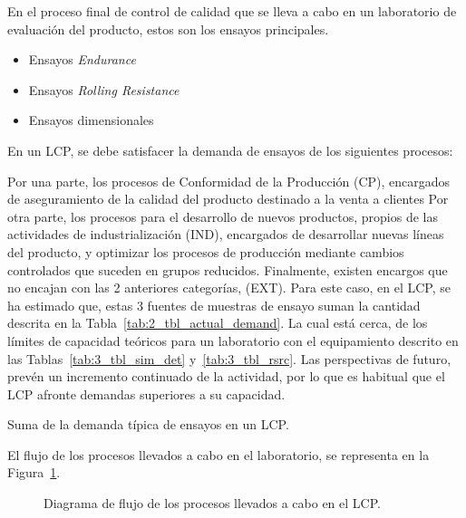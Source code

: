 En el proceso final de control de calidad
que se lleva a cabo en un laboratorio de evaluación del producto,
estos son los ensayos principales.

\begin{itemize}
	\item Ensayos \textit{Endurance}
	\item Ensayos \textit{Rolling Resistance}
	\item Ensayos dimensionales
\end{itemize}

En un LCP,
se debe satisfacer la demanda de ensayos de los siguientes procesos:

Por una parte, los procesos de Conformidad de la Producción (CP),
encargados de aseguramiento de la calidad
del producto destinado a la venta a clientes
Por otra parte, los procesos para el desarrollo de nuevos productos,
propios de las actividades de industrialización (IND),
encargados de desarrollar nuevas líneas del producto,
y optimizar los procesos de producción
mediante cambios controlados que suceden en grupos reducidos.
Finalmente, existen encargos que
no encajan con las 2 anteriores categorías, (EXT).
Para este caso, en el LCP, se ha estimado que,
estas 3 fuentes de muestras de ensayo
suman la cantidad descrita en la Tabla~\ref{tab:2_tbl_actual_demand}.
La cual está cerca, de los límites de capacidad teóricos
para un laboratorio con el equipamiento descrito en
las Tablas~\ref{tab:3_tbl_sim_det} y~\ref{tab:3_tbl_rsrc}.
Las perspectivas de futuro, prevén un incremento continuado de la actividad,
por lo que es habitual que el LCP afronte demandas superiores a su capacidad.

\begin{table}
	\centering
	\caption{Suma de la demanda típica de ensayos en un LCP.}
	
	\label{tab:2_tbl_actual_demand}
\end{table}

El flujo de los procesos llevados a cabo en el laboratorio,
se representa en la Figura~\ref{fig:2_fc_lep_diagram}.

\begin{figure}
	\begin{center}
		
	\end{center}
	\caption{Diagrama de flujo de los procesos llevados a cabo en el LCP.}
	\label{fig:2_fc_lep_diagram}
\end{figure}

